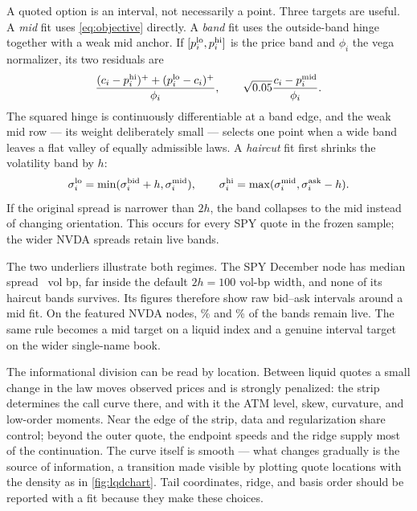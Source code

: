 A quoted option is an interval, not necessarily a point.  Three targets are
useful.  A \emph{mid} fit uses \eqref{eq:objective} directly.  A \emph{band}
fit uses the outside-band hinge together with a weak mid anchor.  If
$[p_i^{\rm lo},p_i^{\rm hi}]$ is the price band and $\phi_i$ the vega
normalizer, its two residuals are
\begin{equation}
\frac{(c_i-p_i^{\rm hi})^++(p_i^{\rm lo}-c_i)^+}{\phi_i},
\qquad
\sqrt{0.05}\frac{c_i-p_i^{\rm mid}}{\phi_i}.
\label{eq:band}
\end{equation}
The squared hinge is continuously differentiable at a band edge, and the
weak mid row --- its weight deliberately small --- selects one point when a
wide band leaves a flat valley of equally admissible laws.
A \emph{haircut} fit first shrinks the volatility band by $h$:
\begin{equation}
\sigma_i^{\rm lo}=\min(\sigma_i^{\rm bid}+h,\sigma_i^{\rm mid}),
\qquad
\sigma_i^{\rm hi}=\max(\sigma_i^{\rm mid},\sigma_i^{\rm ask}-h).
\label{eq:haircut}
\end{equation}
If the original spread is narrower than $2h$, the band collapses to the mid
instead of changing orientation.  This occurs for every SPY quote in the
frozen sample; the wider NVDA spreads retain live bands.

The two underliers illustrate both regimes.  The SPY December node has median
spread \MacSpyDecMedianSpreadBp\ vol bp, far inside the default
$2h=100$ vol-bp width, and none of its haircut bands survives.  Its figures
therefore show raw bid--ask intervals around a mid fit.  On the featured NVDA
nodes, \MacNvdaOneDayBandLivePct\% and \MacNvdaLongBandLivePct\% of the
bands remain live.  The same rule becomes a mid target on a liquid index and a
genuine interval target on the wider single-name book.

The informational division can be read by location.  Between liquid quotes a
small change in the law moves observed prices and is strongly penalized: the
strip determines the call curve there, and with it the ATM level, skew,
curvature, and low-order moments.  Near the edge of the strip, data and
regularization share control; beyond the outer quote, the endpoint speeds
and the ridge supply most of the continuation.  The curve itself is smooth
--- what changes gradually is the source of information, a transition made
visible by plotting quote locations with the density as in
\cref{fig:lqdchart}.  Tail coordinates, ridge, and basis order should be
reported with a fit because they make these choices.

